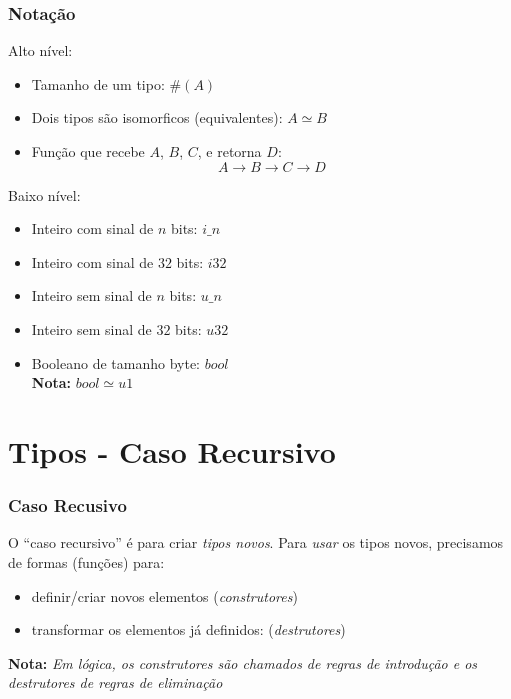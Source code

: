 \documentclass{beamer}
\newcommand{\nota}[1]{\textbf{Nota:}\textit{ #1}}
\newcommand{\typetam}{\#}
\newcommand{\typesim}{\simeq}
\begin{document}
\begin{frame}
    \frametitle{Notação}
    Alto nível:
    \begin{itemize}
        \item Tamanho de um tipo: \(\typetam(A)\)
        \item Dois tipos são isomorficos (equivalentes):
            \( A \typesim B \)
        \item Função que recebe \(A\), \(B\), \(C\),
            e retorna \(D\): \[ A \to B \to C \to D \]
    \end{itemize}

    Baixo nível:
    \begin{itemize}
        \item Inteiro com sinal de \(n\) bits: \(i\_n\)
        \item Inteiro com sinal de \(32\) bits: \(i32\)
        \item Inteiro sem sinal de \(n\) bits: \(u\_n\)
        \item Inteiro sem sinal de \(32\) bits: \(u32\)
        \item Booleano de tamanho byte: \(bool\)
            \\\nota{\(bool \typesim u1\)}
    \end{itemize}
\end{frame}

\section{Tipos - Caso Recursivo}
\begin{frame}
    \frametitle{Caso Recusivo}
    O ``caso recursivo'' é para criar \emph{tipos novos}.
    \vfill
    Para \emph{usar} os tipos novos,
    precisamos de formas (funções) para:
    \begin{itemize}
        \item definir/criar novos elementos
            (\emph{construtores})
        \item transformar os elementos já definidos:
            (\emph{destrutores})
    \end{itemize}
    \vfill
    \nota{Em lógica, os \emph{construtores}
        são chamados de \emph{regras de introdução} e
        os \emph{destrutores}
        de \emph{regras de eliminação}}
\end{frame}
\end{document}
